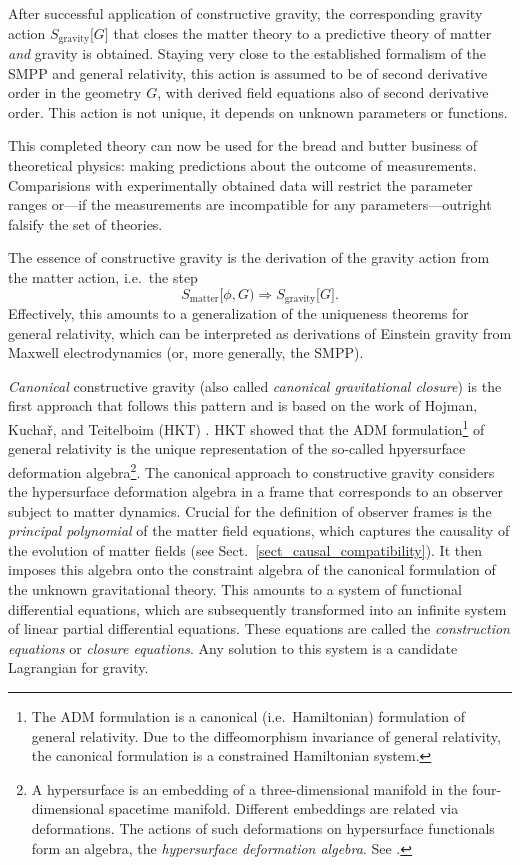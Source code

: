 After successful application of constructive gravity, the corresponding gravity action $S_\text{gravity}\lbrack G\rbrack$ that closes the matter theory to a predictive theory of matter \emph{and} gravity is obtained. Staying very close to the established formalism of the SMPP and general relativity, this action is assumed to be of second derivative order in the geometry $G$, with derived field equations also of second derivative order. This action is not unique, it depends on unknown parameters or functions.

This completed theory can now be used for the bread and butter business of theoretical physics: making predictions about the outcome of measurements. Comparisions with experimentally obtained data will restrict the parameter ranges or---if the measurements are incompatible for any parameters---outright falsify the set of theories.

The essence of constructive gravity is the derivation of the gravity action from the matter action, i.e.~the step
\begin{equation*}
  S_\text{matter}\lbrack\phi,G) \Rightarrow S_\text{gravity}\lbrack G\rbrack.
\end{equation*}
Effectively, this amounts to a generalization of the uniqueness theorems for general relativity, which can be interpreted as derivations of Einstein gravity from Maxwell electrodynamics (or, more generally, the SMPP).

\emph{Canonical} constructive gravity (also called \emph{canonical gravitational closure}) \cite{} is the first approach that follows this pattern and is based on the work of Hojman, Kucha\v{r}, and Teitelboim (HKT) \cite{https://doi.org/10.1016/0003-4916(76)90112-3}. HKT showed that the ADM formulation\footnote{The ADM formulation \cite{adm} is a canonical (i.e.~Hamiltonian) formulation of general relativity. Due to the diffeomorphism invariance of general relativity, the canonical formulation is a constrained Hamiltonian system.} of general relativity is the unique representation of the so-called hpyersurface deformation algebra\footnote{A hypersurface is an embedding of a three-dimensional manifold in the four-dimensional spacetime manifold. Different embeddings are related via deformations. The actions of such deformations on hypersurface functionals form an algebra, the \emph{hypersurface deformation algebra}. See \cite{https://doi.org/10.1016/0003-4916(76)90112-3}.}. The canonical approach to constructive gravity considers the hypersurface deformation algebra in a frame that corresponds to an observer subject to matter dynamics. Crucial for the definition of observer frames is the \emph{principal polynomial} of the matter field equations, which captures the causality of the evolution of matter fields (see Sect.~\ref{sect_causal_compatibility}). It then imposes this algebra onto the constraint algebra of the canonical formulation of the unknown gravitational theory. This amounts to a system of functional differential equations, which are subsequently transformed into an infinite system of linear partial differential equations. These equations are called the \emph{construction equations} or \emph{closure equations}. Any solution to this system is a candidate Lagrangian for gravity.

